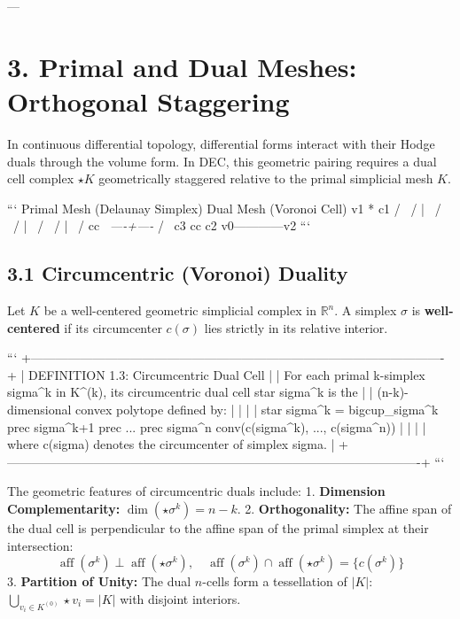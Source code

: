 \documentclass[11pt,twoside,openright]{amsbook}
\begin{document}
---

\section{3. Primal and Dual Meshes: Orthogonal Staggering}

In continuous differential topology, differential forms interact with their Hodge duals through the volume form. In DEC, this geometric pairing requires a dual cell complex $\star K$ geometrically staggered relative to the primal simplicial mesh $K$.

```
Primal Mesh (Delaunay Simplex)        Dual Mesh (Voronoi Cell)
          v1                                     * c1
         /  \                                   / | \
        /    \                                 /  |  \
       /      \                               /   |   \
      /   cc   \                             \textit{----+----}
     /          \                           c3   cc    c2
   v0------------v2
```

\subsection{3.1 Circumcentric (Voronoi) Duality}

Let $K$ be a well-centered geometric simplicial complex in $\mathbb{R}^n$. A simplex $\sigma$ is \textbf{well-centered} if its circumcenter $c(\sigma)$ lies strictly in its relative interior.

```
+----------------------------------------------------------------------------------------------------+
| DEFINITION 1.3: Circumcentric Dual Cell                                                            |
| For each primal k-simplex sigma^k in K^{(k)}, its circumcentric dual cell star sigma^k is the       |
| (n-k)-dimensional convex polytope defined by:                                                      |
|                                                                                                    |
|   star sigma^k = bigcup_{sigma^k prec sigma^{k+1} prec ... prec sigma^n} conv(c(sigma^k), ..., c(sigma^n)) |
|                                                                                                    |
| where c(sigma) denotes the circumcenter of simplex sigma.                                          |
+----------------------------------------------------------------------------------------------------+
```

The geometric features of circumcentric duals include:
1. \textbf{Dimension Complementarity:} $\dim(\star \sigma^k) = n - k$.
2. \textbf{Orthogonality:} The affine span of the dual cell is perpendicular to the affine span of the primal simplex at their intersection:
   $$\operatorname{aff}(\sigma^k) \perp \operatorname{aff}(\star \sigma^k), \quad \operatorname{aff}(\sigma^k) \cap \operatorname{aff}(\star \sigma^k) = \{c(\sigma^k)\}$$
3. \textbf{Partition of Unity:} The dual $n$-cells form a tessellation of $|K|$: $\bigcup_{v_i \in K^{(0)}} \star v_i = |K|$ with disjoint interiors.
\end{document}

